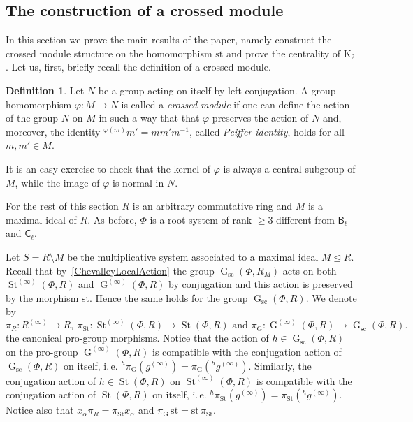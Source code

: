 \documentclass[oneside, 11pt]{amsart}
\numberwithin{equation}{section}
\theoremstyle{definition}
\newtheorem{df}[lemma]{Definition} \Crefname{df}{Definition}{Definitions}
\theoremstyle{remark}
\DeclareMathOperator\St{St}
\DeclareMathOperator\GG{G}
\newcommand{\up}[2]{{^{#1}\!{#2}}}
\newcommand{\rB}{\mathsf{B}}
\newcommand{\rC}{\mathsf{C}}
\begin{document}
\subsection{The construction of a crossed module}
In this section we prove the main results of the paper, namely construct the crossed module structure on the homomorphism $\mathrm{st}$ and prove the centrality of $\mathrm{K}_2$. Let us, first, briefly recall the definition of a crossed module. 

\begin{df} \label{df:crossed-module}
Let $N$ be a group acting on itself by left conjugation.
A group homomorphism $\varphi\colon M \to N$ is called a {\it crossed module} if one can define the action of the group $N$ on $M$ in such a way that that $\varphi$ preserves the action of $N$ and, moreover, the identity ${}^{\varphi(m)}\!m' = m m' m^{-1}$, called {\it Peiffer identity}, holds for all $m, m' \in M$.
\end{df}
It is an easy exercise to check that the kernel of $\varphi$ is always a central subgroup of $M$, while the image of $\varphi$ is normal in $N$.

For the rest of this section $R$ is an arbitrary commutative ring and $M$ is a maximal ideal of $R$.
As before, \(\Phi\) is a root system of rank \(\geq 3\) different from \(\rB_\ell\) and \(\rC_\ell\).

Let $S = R\setminus M$ be the multiplicative system associated to a maximal ideal $M \trianglelefteq R$.
Recall that by~\cref{ChevalleyLocalAction} the group $\GG_{\mathrm{sc}}(\Phi, R_M)$ acts on both $\St^{(\infty)}(\Phi, R)$ and $\GG^{(\infty)}(\Phi, R)$ by conjugation and this action is preserved by the morphism $\mathrm{st}$. Hence the same holds for the group $\GG_{\mathrm{sc}}(\Phi, R)$.
We denote by \[\pi_R \colon R^{(\infty)} \to R,\ \pi_{\St} \colon \St^{(\infty)}(\Phi, R) \to \St(\Phi, R)\text{ and } \pi_{\GG} \colon \GG^{(\infty)}(\Phi, R) \to \GG_{\mathrm{sc}}(\Phi, R).\] the canonical pro-group morphisms. Notice that the action of $h\in \GG_{\mathrm{sc}}(\Phi, R)$ on the pro-group $\GG^{(\infty)}(\Phi, R)$ is compatible with the conjugation action of $\GG_{\mathrm{sc}}(\Phi, R)$ on itself, i.\,e. $\up{h}\pi_{\GG}(g^{(\infty)}) = \pi_{\GG}(\up{h} {g^{(\infty)}})$.
Similarly, the conjugation action of $h\in \St(\Phi, R)$ on $\St^{(\infty)}(\Phi, R)$ is compatible with the conjugation action of $\St(\Phi, R)$ on itself, i.\,e. $\up{h}\pi_{\St}(g^{(\infty)}) = \pi_{\St}(\up{h}{g^{(\infty)}})$.
Notice also that $x_\alpha \pi_R = \pi_{\St} x_\alpha$ and $\pi_{\GG}\, \mathrm{st} = \mathrm{st}\, \pi_{\St}$.
\end{document}
